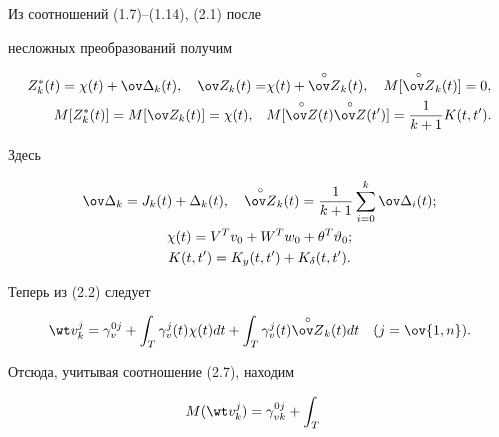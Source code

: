 \begin{pf} Из соотношений (1.7)--(1.14), (2.1) после 


несложных преобразований получим 


\begin{equation} 


\begin{split} 


Z^*_k(t)=\chi(t)+\ov\Delta_k(t),\quad 


\ov Z_k(t)=&\chi(t)+\overset{\circ}{\ov Z}{}_k(t), 


\quad M[\overset{\circ}{\ov Z}{}_k(t)]=0,\\ 


%


M[Z^*_k(t)]=M[\ov Z_k(t)]=\chi(t),\quad 


&M[\overset{\circ}{\ov Z}{}(t) 


\overset{\circ}{\ov Z}{}(t')]=\frac{1}{k+1}K(t,t'). 


\end{split} 


\end{equation} 


Здесь 


\begin{gather} 


\ov\Delta_k=J_k(t)+\Delta_k(t),\quad 


\overset{\circ}{\ov Z}{}_k(t)=\frac{1}{k+1}\sum^k_{i=0} 


\ov\Delta_i(t);\notag\\ 


\chi(t)=V^T v_0+W^T w_0+\theta^T\vartheta_0;\\ 


K(t,t')=K_y(t,t')+K_\delta(t,t').\notag 


\end{gather} 


Теперь из (2.2) следует


$$ 


\wt v^j_k=\gamma^{0j}_v+\int_T \gamma^j_v(t) 


\chi(t)dt+\int_T \gamma^j_v(t) 


\overset{\circ}{\ov Z}{}_k(t)dt\quad (j=\ov{1,n}). 


$$ 


Отсюда, учитывая соотношение (2.7), находим 


\begin{align*}


M(\wt v^j_k)&=\gamma^{0j}_{vk}+\int_T 



\end{align*}
\end{pf}
